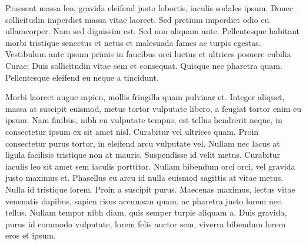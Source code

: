 \documentclass{article}
\begin{document}
  Praesent massa leo, gravida eleifend justo lobortis, iaculis sodales ipsum. Donec sollicitudin imperdiet massa vitae laoreet. Sed pretium imperdiet odio eu ullamcorper. Nam sed dignissim est. Sed non aliquam ante. Pellentesque habitant morbi tristique senectus et netus et malesuada fames ac turpis egestas. Vestibulum ante ipsum primis in faucibus orci luctus et ultrices posuere cubilia Curae; Duis sollicitudin vitae sem et consequat. Quisque nec pharetra quam. Pellentesque eleifend eu neque a tincidunt.\stopmsdata


  Morbi laoreet augue sapien, mollis fringilla quam pulvinar et. Integer aliquet, massa at suscipit euismod, metus tortor vulputate libero, a feugiat tortor enim eu ipsum. Nam finibus, nibh eu vulputate tempus, est tellus hendrerit neque, in consectetur ipsum ex sit amet nisl. Curabitur vel ultrices quam. Proin consectetur purus tortor, in eleifend arcu vulputate vel. Nullam nec lacus at ligula facilisis tristique non at mauris. Suspendisse id velit metus. Curabitur iaculis leo sit amet sem iaculis porttitor. Nullam bibendum orci orci, vel gravida justo maximus et. Phasellus eu arcu id nulla euismod sagittis at vitae metus. Nulla id tristique lorem. Proin a suscipit purus. Maecenas maximus, lectus vitae venenatis dapibus, sapien risus accumsan quam, ac pharetra justo lorem nec tellus. Nullam tempor nibh diam, quis semper turpis aliquam a. Duis gravida, purus id commodo vulputate, lorem felis auctor sem, viverra bibendum lorem eros et ipsum.\stopmsdata

\endnumbering
\end{document}
